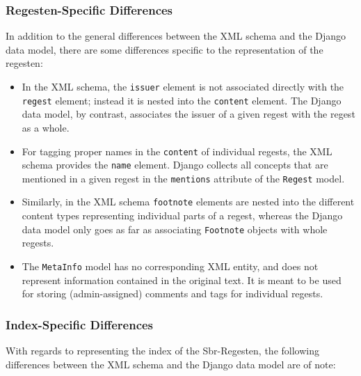 \subsubsection{Regesten-Specific Differences}
\label{sec:reg-model}

In addition to the general differences between the XML schema and the
Django data model, there are some differences specific to the
representation of the regesten:

\begin{itemize}
\item In the XML schema, the \texttt{issuer} element is not associated
  directly with the \texttt{regest} element; instead it is nested into
  the \texttt{content} element. The Django data model, by contrast,
  associates the issuer of a given regest with the regest as a whole.
\item For tagging proper names in the \texttt{content} of individual
  regests, the XML schema provides the \texttt{name} element. Django
  collects all concepts that are mentioned in a given regest in the
  \texttt{mentions} attribute of the \texttt{Regest} model.
\item Similarly, in the XML schema \texttt{footnote} elements are
  nested into the different content types representing individual
  parts of a regest, whereas the Django data model only goes as far as
  associating \texttt{Footnote} objects with whole regests.
\item The \texttt{MetaInfo} model has no corresponding XML entity, and
  does not represent information contained in the original text. It is
  meant to be used for storing (admin-assigned) comments and tags for
  individual regests.
\end{itemize}

\subsubsection{Index-Specific Differences}
\label{sec:index-model}

With regards to representing the index of the Sbr-Regesten, the
following differences between the XML schema and the Django data model
are of note:

